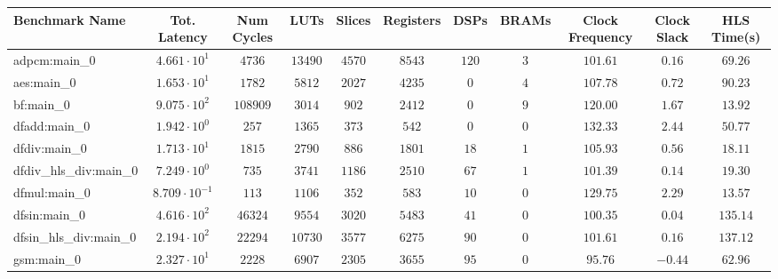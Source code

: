\begin{tabular}{|l|c|c|c|c|c|c|c|c|c|c|}
\hline
Benchmark Name          & Tot. Latency            & Num Cycles & LUTs      & Slices    & Registers & DSPs    & BRAMs  & Clock Frequency & Clock Slack & HLS Time(s) \\
\hline
adpcm:main\_0           & $ 4.661 \cdot 10^{1}  $ & $ 4736   $ & $ 13490 $ & $ 4570  $ & $ 8543  $ & $ 120 $ & $ 3  $ & $ 101.61      $ & $ 0.16    $ & $ 69.26   $ \\
aes:main\_0             & $ 1.653 \cdot 10^{1}  $ & $ 1782   $ & $ 5812  $ & $ 2027  $ & $ 4235  $ & $ 0   $ & $ 4  $ & $ 107.78      $ & $ 0.72    $ & $ 90.23   $ \\
bf:main\_0              & $ 9.075 \cdot 10^{2}  $ & $ 108909 $ & $ 3014  $ & $ 902   $ & $ 2412  $ & $ 0   $ & $ 9  $ & $ 120.00      $ & $ 1.67    $ & $ 13.92   $ \\
dfadd:main\_0           & $ 1.942 \cdot 10^{0}  $ & $ 257    $ & $ 1365  $ & $ 373   $ & $ 542   $ & $ 0   $ & $ 0  $ & $ 132.33      $ & $ 2.44    $ & $ 50.77   $ \\
dfdiv:main\_0           & $ 1.713 \cdot 10^{1}  $ & $ 1815   $ & $ 2790  $ & $ 886   $ & $ 1801  $ & $ 18  $ & $ 1  $ & $ 105.93      $ & $ 0.56    $ & $ 18.11   $ \\
dfdiv\_hls\_div:main\_0 & $ 7.249 \cdot 10^{0}  $ & $ 735    $ & $ 3741  $ & $ 1186  $ & $ 2510  $ & $ 67  $ & $ 1  $ & $ 101.39      $ & $ 0.14    $ & $ 19.30   $ \\
dfmul:main\_0           & $ 8.709 \cdot 10^{-1} $ & $ 113    $ & $ 1106  $ & $ 352   $ & $ 583   $ & $ 10  $ & $ 0  $ & $ 129.75      $ & $ 2.29    $ & $ 13.57   $ \\
dfsin:main\_0           & $ 4.616 \cdot 10^{2}  $ & $ 46324  $ & $ 9554  $ & $ 3020  $ & $ 5483  $ & $ 41  $ & $ 0  $ & $ 100.35      $ & $ 0.04    $ & $ 135.14  $ \\
dfsin\_hls\_div:main\_0 & $ 2.194 \cdot 10^{2}  $ & $ 22294  $ & $ 10730 $ & $ 3577  $ & $ 6275  $ & $ 90  $ & $ 0  $ & $ 101.61      $ & $ 0.16    $ & $ 137.12  $ \\
gsm:main\_0             & $ 2.327 \cdot 10^{1}  $ & $ 2228   $ & $ 6907  $ & $ 2305  $ & $ 3655  $ & $ 95  $ & $ 0  $ & $ 95.76       $ & $ -0.44   $ & $ 62.96   $ \\

\end{tabular}
